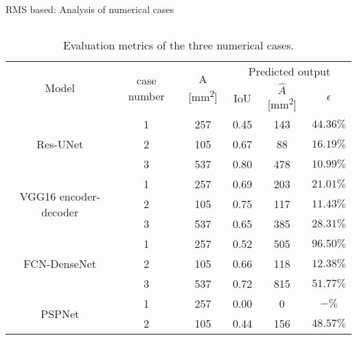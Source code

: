 \documentclass[10pt,aspectratio=169,dvipsnames]{beamer} %
\begin{document}
	\begin{frame}{RMS based: Analysis of numerical cases}
		\begin{columns}[T]
			\tiny
			\begin{column}[t]{0.48\textwidth}
				\begin{table}
					\caption{Evaluation metrics of the three numerical cases.}
					\label{tab:RMS_num_cases}
					\begin{tabular}{cccccc}
						\toprule[1.5pt]
						\multirow{2}{*}{Model} & \multirow{2}{*}{case number} & \multicolumn{1}{c}{\multirow{2}{*}{A [mm\textsuperscript{2}]}} & \multicolumn{3}{c}{Predicted output} \\ 
						\cmidrule(lr){4-6} & & & \multicolumn{1}{c}{IoU} & \multicolumn{1}{c}{\(\hat{A}\) [mm\textsuperscript{2}]} & \(\epsilon\) \\
						\midrule
						\multirow{3}{*}{Res-UNet} 							
						& 1 & 257 & \multicolumn{1}{c}{0.45} & \multicolumn{1}{c}{143} & \(44.36\%\) \\ 
						& 2 & 105 & \multicolumn{1}{c}{0.67} & \multicolumn{1}{c}{88} & \(16.19\%\) \\ 
						& 3 & 537 & \multicolumn{1}{c}{0.80} & \multicolumn{1}{c}{478} & \(10.99\%\) \\ 
						\midrule
						\multirow{3}{*}{VGG16 encoder-decoder} 
						& 1 & 257 & \multicolumn{1}{c}{0.69} & \multicolumn{1}{c}{203} & \(21.01\%\) \\ 
						& 2 & 105 & \multicolumn{1}{c}{0.75} & \multicolumn{1}{c}{117} & \(11.43\%\) \\ 
						& 3 & 537 & \multicolumn{1}{c}{0.65} & \multicolumn{1}{c}{385} & \(28.31\%\) \\ 
						\midrule
						\multirow{3}{*}{FCN-DenseNet} 
						& 1 & 257 & \multicolumn{1}{c}{0.52} & \multicolumn{1}{c}{505} & \(96.50\%\) \\ 
						& 2 & 105 & \multicolumn{1}{c}{0.66} & \multicolumn{1}{c}{118} & \(12.38\%\) \\ 
						& 3 & 537 & \multicolumn{1}{c}{0.72} & \multicolumn{1}{c}{815} & \(51.77\%\) \\ 
						\midrule
						\multirow{3}{*}{PSPNet} 
						& 1 & 257 & \multicolumn{1}{c}{0.00} & \multicolumn{1}{c}{0} & \(-\%\) \\ 
						& 2 & 105 & \multicolumn{1}{c}{0.44} & \multicolumn{1}{c}{156} & \(48.57\%\) \\ 

\end{tabular}
\end{table}
\end{column}
\end{columns}
\end{frame}
\end{document}
